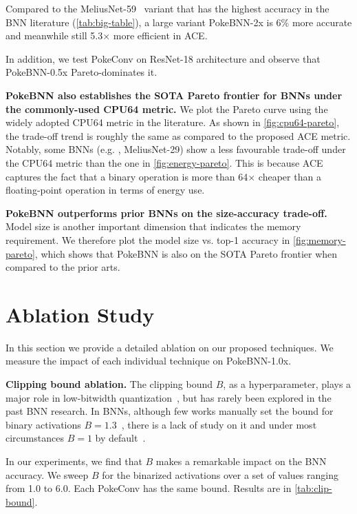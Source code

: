 Compared to the MeliusNet-59~\cite{Bethge2021meliusnet} variant that has the highest accuracy in the BNN literature (\ref{tab:big-table}), a large variant PokeBNN-2x is 6\% more accurate and meanwhile still 5.3$\times$ more efficient in ACE.

In addition, we test PokeConv on ResNet-18 architecture and observe that PokeBNN-0.5x Pareto-dominates it.

\textbf{{PokeBNN} also establishes the SOTA Pareto frontier for BNNs under the commonly-used CPU64 metric.} We plot the Pareto curve using the widely adopted CPU64 metric in the literature. As shown in \ref{fig:cpu64-pareto}, the trade-off trend is roughly the same as compared to the proposed ACE metric. Notably, some BNNs (e.g. , MeliusNet-29) show a less favourable trade-off under the CPU64 metric than the one in \ref{fig:energy-pareto}. This is because ACE captures the fact that a binary operation is more than 64$\times$ cheaper than a floating-point operation in terms of energy use. 

\textbf{{PokeBNN} outperforms prior BNNs on the size-accuracy trade-off.} Model size is another important dimension that indicates the memory requirement. We therefore plot the model size vs. top-1 accuracy in \ref{fig:memory-pareto}, which shows that {PokeBNN} is also on the SOTA Pareto frontier when compared to the prior arts.

\section{Ablation Study}
\label{sec:ablation}

In this section we provide a detailed ablation on our proposed techniques. We measure the impact of each individual technique on PokeBNN-1.0x.

\textbf{Clipping bound ablation.} The clipping bound $B$, as a hyperparameter, plays a major role in low-bitwidth quantization~\cite{Abdolrashidi2021pareto, choi2018pact}, but has rarely been explored in the past BNN research. In BNNs, although few works manually set the bound for binary activations $B=1.3$~\cite{Bethge2019bdense, Bethge2021meliusnet}, there is a lack of study on it and under most circumstances $B=1$ by default~\cite{hubara2016bnn, Liu2018bireal, Liu2020reactnet}.

In our experiments, we find that $B$ makes a remarkable impact on the BNN accuracy. We sweep $B$ for the binarized activations over a set of values ranging from 1.0 to 6.0. Each PokeConv has the same bound. Results are in \ref{tab:clip-bound}.

